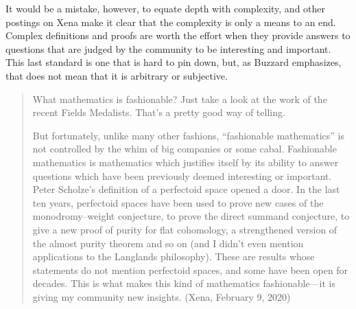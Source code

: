 \documentclass{amsart}
\theoremstyle{definition}
\theoremstyle{remark}
\numberwithin{equation}{section}
\begin{document}
It would be a mistake, however, to equate depth with complexity, and other postings on Xena make it clear that the complexity is only a means to an end. Complex definitions and proofs are worth the effort when they provide answers to questions that are judged by the community to be interesting and important. This last standard is one that is hard to pin down, but, as Buzzard emphasizes, that does not mean that it is arbitrary or subjective.

\begin{quote}
\noindent What mathematics is fashionable? Just take a look at the work of the recent Fields Medalists. That's a pretty good way of telling.

But fortunately, unlike many other fashions, ``fashionable mathematics'' is not controlled by the whim of big companies or some cabal. Fashionable mathematics is mathematics which justifies itself by its ability to answer questions which have been previously deemed interesting or important. Peter Scholze’s definition of a perfectoid space opened a door. In the last ten years, perfectoid spaces have been used to prove new cases of the monodromy--weight conjecture, to prove the direct summand conjecture, to give a new proof of purity for flat cohomology, a strengthened version of the almost purity theorem and so on (and I didn't even mention applications to the Langlands philosophy). These are results whose statements do not mention perfectoid spaces, and some have been open for decades. This is what makes this kind of mathematics fashionable---it is giving my community new insights. (Xena, February 9, 2020)
\end{quote}
\end{document}
